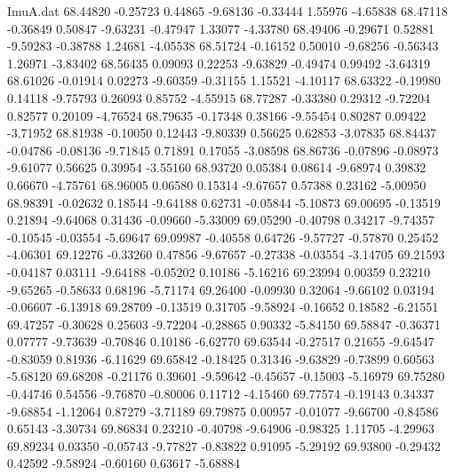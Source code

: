 \begin{filecontents}{ImuA.dat}
  68.44820   -0.25723    0.44865   -9.68136   -0.33444    1.55976   -4.65838
  68.47118   -0.36849    0.50847   -9.63231   -0.47947    1.33077   -4.33780
  68.49406   -0.29671    0.52881   -9.59283   -0.38788    1.24681   -4.05538
  68.51724   -0.16152    0.50010   -9.68256   -0.56343    1.26971   -3.83402
  68.56435    0.09093    0.22253   -9.63829   -0.49474    0.99492   -3.64319
  68.61026   -0.01914    0.02273   -9.60359   -0.31155    1.15521   -4.10117
  68.63322   -0.19980    0.14118   -9.75793    0.26093    0.85752   -4.55915
  68.77287   -0.33380    0.29312   -9.72204    0.82577    0.20109   -4.76524
  68.79635   -0.17348    0.38166   -9.55454    0.80287    0.09422   -3.71952
  68.81938   -0.10050    0.12443   -9.80339    0.56625    0.62853   -3.07835
  68.84437   -0.04786   -0.08136   -9.71845    0.71891    0.17055   -3.08598
  68.86736   -0.07896   -0.08973   -9.61077    0.56625    0.39954   -3.55160
  68.93720    0.05384    0.08614   -9.68974    0.39832    0.66670   -4.75761
  68.96005    0.06580    0.15314   -9.67657    0.57388    0.23162   -5.00950
  68.98391   -0.02632    0.18544   -9.64188    0.62731   -0.05844   -5.10873
  69.00695   -0.13519    0.21894   -9.64068    0.31436   -0.09660   -5.33009
  69.05290   -0.40798    0.34217   -9.74357   -0.10545   -0.03554   -5.69647
  69.09987   -0.40558    0.64726   -9.57727   -0.57870    0.25452   -4.06301
  69.12276   -0.33260    0.47856   -9.67657   -0.27338   -0.03554   -3.14705
  69.21593   -0.04187    0.03111   -9.64188   -0.05202    0.10186   -5.16216
  69.23994    0.00359    0.23210   -9.65265   -0.58633    0.68196   -5.71174
  69.26400   -0.09930    0.32064   -9.66102    0.03194   -0.06607   -6.13918
  69.28709   -0.13519    0.31705   -9.58924   -0.16652    0.18582   -6.21551
  69.47257   -0.30628    0.25603   -9.72204   -0.28865    0.90332   -5.84150
  69.58847   -0.36371    0.07777   -9.73639   -0.70846    0.10186   -6.62770
  69.63544   -0.27517    0.21655   -9.64547   -0.83059    0.81936   -6.11629
  69.65842   -0.18425    0.31346   -9.63829   -0.73899    0.60563   -5.68120
  69.68208   -0.21176    0.39601   -9.59642   -0.45657   -0.15003   -5.16979
  69.75280   -0.44746    0.54556   -9.76870   -0.80006    0.11712   -4.15460
  69.77574   -0.19143    0.34337   -9.68854   -1.12064    0.87279   -3.71189
  69.79875    0.00957   -0.01077   -9.66700   -0.84586    0.65143   -3.30734
  69.86834    0.23210   -0.40798   -9.64906   -0.98325    1.11705   -4.29963
  69.89234    0.03350   -0.05743   -9.77827   -0.83822    0.91095   -5.29192
  69.93800   -0.29432    0.42592   -9.58924   -0.60160    0.63617   -5.68884

\end{filecontents}
